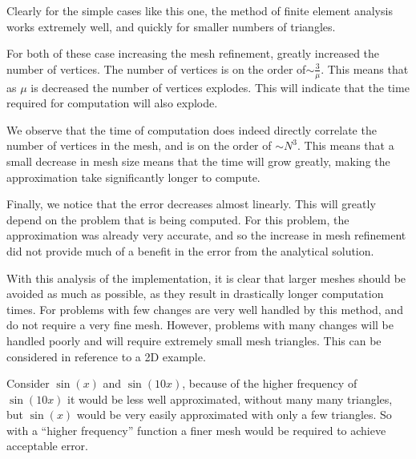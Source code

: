 \documentclass[../fem.tex]{subfile}
\begin{document}
Clearly for the simple cases like this one, the method of finite element
analysis works extremely well, and quickly for smaller numbers of triangles.

For both of these case increasing the mesh refinement, greatly increased the
number of vertices. The number of vertices is on the order
of$\sim\frac{3}{\mu}$. This means that as $\mu$ is decreased the number of
vertices explodes. This will indicate that the time required for computation
will also explode.

We observe that the time of computation does indeed directly correlate the
number of vertices in the mesh, and is on the order of $\sim N^3$. This means
that a small decrease in mesh size means that the time will grow greatly,
making the approximation take significantly longer to compute.

Finally, we notice that the error decreases almost linearly. This will greatly
depend on the problem that is being computed. For this problem, the
approximation was already very accurate, and so the increase in mesh
refinement did not provide much of a benefit in the error from the analytical
solution.

With this analysis of the implementation, it is clear that larger meshes should
be avoided as much as possible, as they result in drastically longer computation
times. For problems with few changes are very well handled by this method, and
do not require a very fine mesh. However, problems with many changes will be
handled poorly and will require extremely small mesh triangles. This can be
considered in reference to a 2D example.

Consider $\sin(x)$ and $\sin(10x)$, because of the higher frequency of
$\sin(10x)$ it would be less well approximated, without many many triangles,
but $\sin(x)$ would be very easily approximated with only a few triangles. So
with a ``higher frequency'' function a finer mesh would be required to achieve
acceptable error.
\end{document}

